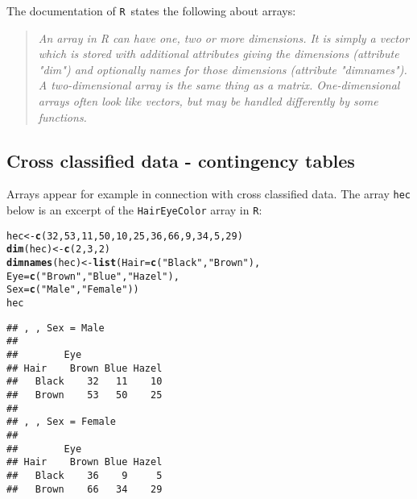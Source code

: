\documentclass[10pt]{article}\usepackage[]{graphicx}\usepackage[]{xcolor}
\makeatletter
\newcommand{\hlnum}[1]{\textcolor[rgb]{0.686,0.059,0.569}{#1}}%
\newcommand{\hlstr}[1]{\textcolor[rgb]{0.192,0.494,0.8}{#1}}%
\newcommand{\hlstd}[1]{\textcolor[rgb]{0.345,0.345,0.345}{#1}}%
\newcommand{\hlkwb}[1]{\textcolor[rgb]{0.69,0.353,0.396}{#1}}%
\newcommand{\hlkwc}[1]{\textcolor[rgb]{0.333,0.667,0.333}{#1}}%
\newcommand{\hlkwd}[1]{\textcolor[rgb]{0.737,0.353,0.396}{\textbf{#1}}}%
\newenvironment{kframe}{%
 \def\at@end@of@kframe{}%
 \ifinner\ifhmode%
  \def\at@end@of@kframe{\end{minipage}}%
  \begin{minipage}{\columnwidth}%
 \fi\fi%
 \def\FrameCommand##1{\hskip\@totalleftmargin \hskip-\fboxsep
 \colorbox{shadecolor}{##1}\hskip-\fboxsep
     \hskip-\linewidth \hskip-\@totalleftmargin \hskip\columnwidth}%
 \MakeFramed {\advance\hsize-\width
   \@totalleftmargin\z@ \linewidth\hsize
   \@setminipage}}%
 {\par\unskip\endMakeFramed%
 \at@end@of@kframe}
\newenvironment{knitrout}{}{} %
\def\code#1{\texttt{#1}}
\def\R{\texttt{R}}
\makeatother
\begin{document}
The documentation of \R\ states the following about arrays:

\begin{quote}
  \em An array in R can have one, two or more dimensions. It is simply
  a vector which is stored with additional attributes giving the
  dimensions (attribute "dim") and optionally names for those
  dimensions (attribute "dimnames").  A two-dimensional array is the
  same thing as a matrix.  One-dimensional arrays often look like
  vectors, but may be handled differently by some functions.
\end{quote}







\subsection{Cross classified data - contingency tables}
\label{sec:new}

Arrays appear for example in connection with cross classified data. The array
\code{hec} below is an excerpt of the \code{HairEyeColor} array in \R:

\begin{knitrout}\small
{}\color{fgcolor}\begin{kframe}
\begin{alltt}
\hlstd{hec} \hlkwb{<-} \hlkwd{c}\hlstd{(}\hlnum{32}\hlstd{,} \hlnum{53}\hlstd{,} \hlnum{11}\hlstd{,} \hlnum{50}\hlstd{,} \hlnum{10}\hlstd{,} \hlnum{25}\hlstd{,} \hlnum{36}\hlstd{,} \hlnum{66}\hlstd{,} \hlnum{9}\hlstd{,} \hlnum{34}\hlstd{,} \hlnum{5}\hlstd{,} \hlnum{29}\hlstd{)}
\hlkwd{dim}\hlstd{(hec)} \hlkwb{<-} \hlkwd{c}\hlstd{(}\hlnum{2}\hlstd{,} \hlnum{3}\hlstd{,} \hlnum{2}\hlstd{)}
\hlkwd{dimnames}\hlstd{(hec)} \hlkwb{<-} \hlkwd{list}\hlstd{(}\hlkwc{Hair} \hlstd{=} \hlkwd{c}\hlstd{(}\hlstr{"Black"}\hlstd{,} \hlstr{"Brown"}\hlstd{),}
                      \hlkwc{Eye} \hlstd{=} \hlkwd{c}\hlstd{(}\hlstr{"Brown"}\hlstd{,} \hlstr{"Blue"}\hlstd{,} \hlstr{"Hazel"}\hlstd{),}
                      \hlkwc{Sex} \hlstd{=} \hlkwd{c}\hlstd{(}\hlstr{"Male"}\hlstd{,} \hlstr{"Female"}\hlstd{))}
\hlstd{hec}
\end{alltt}
\begin{verbatim}
## , , Sex = Male
## 
##        Eye
## Hair    Brown Blue Hazel
##   Black    32   11    10
##   Brown    53   50    25
## 
## , , Sex = Female
## 
##        Eye
## Hair    Brown Blue Hazel
##   Black    36    9     5
##   Brown    66   34    29
\end{verbatim}
\end{kframe}
\end{knitrout}
\end{document}

